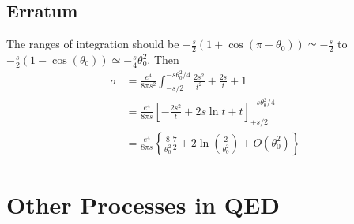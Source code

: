 \subsection*{Erratum}%

The ranges of integration should be $- \frac{s}{2} ( 1+  \cos(\pi - \theta_0)) \simeq -\frac{s}{2}$ to $-\frac{s}{2}(1 - \cos(\theta_0)) \simeq -\frac{s}{4} \theta_0^2$. Then 
\begin{align}
  \sigma &= \frac{e^4}{8 \pi s^2} \int_{-s / 2}^{-s \theta_0^2 / 4} \frac{2s^2}{t^2} + \frac{2s}{t} + 1 \\
	 &= \frac{e^{4}}{8 \pi s} [- \frac{2s^2}{t} + 2 s \ln t + t]_{+s / 2}^{-s \theta_0^2 / 4} \\
	 &= \frac{e^4}{ 8\pi s} \left\{ \frac{8}{\theta_0^2}  \frac{7}{2} + 2 \ln( \frac{2}{\theta_0^2}) + O(\theta_0^2) \right\}
\end{align}

\section{Other Processes in QED}%
\label{sec:other_processes_in_qed}


